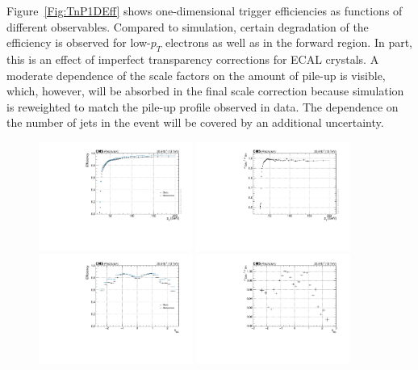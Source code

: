 Figure~\ref{Fig:TnP1DEff} shows one-dimensional trigger efficiencies as functions of different observables.
Compared to simulation, certain degradation of the efficiency is observed for low-$p_{T}$ electrons as well as in the forward region.
In part, this is an effect of imperfect transparency corrections for ECAL crystals.
A moderate dependence of the scale factors on the amount of pile-up is visible, which, however, will be absorbed in the final scale correction because simulation is reweighted to match the pile-up profile observed in data.
The dependence on the number of jets in the event will be covered by an additional uncertainty.

\begin{figure}
  \centering
  \includegraphics[width=0.45\textwidth]{fig/chapt7/trigger_eff/eff_pt.pdf}
  \includegraphics[width=0.45\textwidth]{fig/chapt7/trigger_eff/sf_pt.pdf} \\
  \includegraphics[width=0.45\textwidth]{fig/chapt7/trigger_eff/eff_eta.pdf}
  \includegraphics[width=0.45\textwidth]{fig/chapt7/trigger_eff/sf_eta.pdf} \\

\end{figure}
